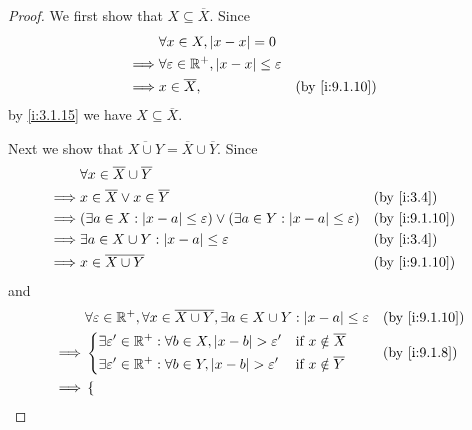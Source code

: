 \begin{proof}
  We first show that \(X \subseteq \overline{X}\).
  Since
  \begin{align*}
             & \forall x \in X, \abs{x - x} = 0                                              \\
    \implies & \forall \varepsilon \in \R^+, \abs{x - x} \leq \varepsilon                    \\
    \implies & x \in \overline{X},                                        &  & \by{i:9.1.10}
  \end{align*}
  by \cref{i:3.1.15} we have \(X \subseteq \overline{X}\).

  Next we show that \(\overline{X \cup Y} = \overline{X} \cup \overline{Y}\).
  Since
  \begin{align*}
             & \forall x \in \overline{X} \cup \overline{Y}                                                                              \\
    \implies & x \in \overline{X} \lor x \in \overline{Y}                                                             &  & \by{i:3.4}    \\
    \implies & (\exists a \in X : \abs{x - a} \leq \varepsilon) \lor (\exists a \in Y : \abs{x - a} \leq \varepsilon) &  & \by{i:9.1.10} \\
    \implies & \exists a \in X \cup Y : \abs{x - a} \leq \varepsilon                                                  &  & \by{i:3.4}    \\
    \implies & x \in \overline{X \cup Y}                                                                              &  & \by{i:9.1.10}
  \end{align*}
  and
  \begin{align*}
             & \forall \varepsilon \in \R^+, \forall x \in \overline{X \cup Y}, \exists a \in X \cup Y : \abs{x - a} \leq \varepsilon &  & \by{i:9.1.10} \\
    \implies & \begin{dcases}
                 \exists \varepsilon' \in \R^+ : \forall b \in X, \abs{x - b} > \varepsilon' & \text{if } x \notin \overline{X} \\
                 \exists \varepsilon' \in \R^+ : \forall b \in Y, \abs{x - b} > \varepsilon' & \text{if } x \notin \overline{Y}
               \end{dcases}      &  & \by{i:9.1.8}                            \\
    \implies & \begin{dcases}

\end{dcases}
\end{align*}
\end{proof}
